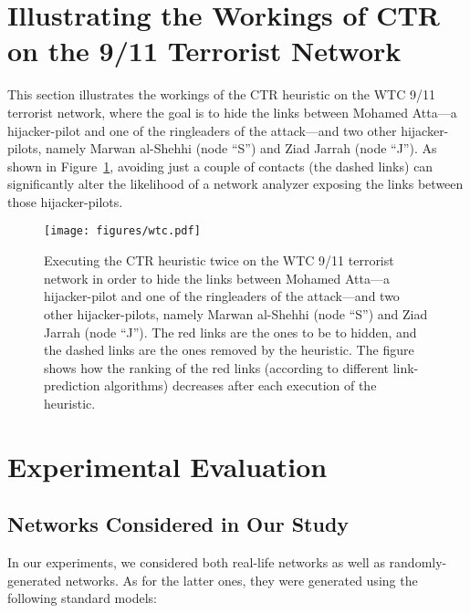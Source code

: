 \documentclass[twocolumn]{article}
\begin{document}
\clearpage

\section{Illustrating the Workings of CTR on the 9/11 Terrorist Network}\label{sec:WTC}

\noindent This section illustrates the workings of the CTR heuristic on the WTC 9/11 terrorist network, where the goal is to hide the links between Mohamed Atta---a hijacker-pilot and one of the ringleaders of the attack---and two other hijacker-pilots, namely Marwan al-Shehhi (node ``S'') and Ziad Jarrah (node ``J''). As shown in Figure~\ref{fig:wtc}, avoiding just a couple of contacts (the dashed links) can significantly alter the likelihood of a network analyzer exposing the links between those hijacker-pilots.

\begin{figure}[ht!]
 \centering
 \texttt{[image: figures/wtc.pdf]}
\caption{Executing the CTR heuristic twice on the WTC 9/11 terrorist network in order to hide the links between Mohamed Atta---a hijacker-pilot and one of the ringleaders of the attack---and two other hijacker-pilots, namely Marwan al-Shehhi (node ``S'') and Ziad Jarrah (node ``J''). The red links are the ones to be to hidden, and the dashed links are the ones removed by the heuristic. The figure shows how the ranking of the red links (according to different link-prediction algorithms) decreases after each execution of the heuristic.}
 \label{fig:wtc}
\end{figure}

\clearpage
\section{Experimental Evaluation}\label{sec:allFigures}

\subsection{Networks Considered in Our Study}\label{sec:networks}

\noindent In our experiments, we considered both real-life networks as well as randomly-generated networks. As for the latter ones, they were generated using the following standard models:
\end{document}
